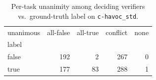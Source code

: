 \begin{table}[t]
  \centering
  \caption{Per-task unanimity among deciding verifiers vs.\ ground-truth label on \texttt{c-havoc_std}.}
  \label{tab:unanimous-c-havoc_std}
\begin{tabular}{lrrrr}
\toprule
unanimous & all-false & all-true & conflict & none \\
label &  &  &  &  \\
\midrule
false & 192 & 2 & 267 & 0 \\
true & 177 & 83 & 288 & 1 \\
\bottomrule
\end{tabular}
\end{table}
